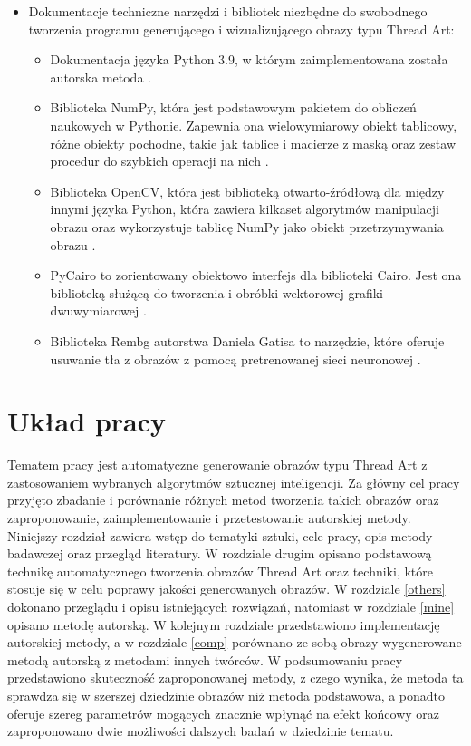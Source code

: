\documentclass[a4paper, 12pt, polish, twoside]{extreport}
\begin{document}
\begin{itemize}
\begin{itemize}
        \end{itemize}
        \item Dokumentacje techniczne narzędzi i bibliotek niezbędne do swobodnego tworzenia programu generującego i wizualizującego obrazy typu Thread Art:
        \begin{itemize}
            \item Dokumentacja języka Python 3.9, w którym zaimplementowana została autorska metoda \cite{python39}.
            \item Biblioteka NumPy, która jest podstawowym pakietem do obliczeń naukowych w Pythonie. Zapewnia ona wielowymiarowy obiekt tablicowy, różne obiekty pochodne, takie jak tablice i macierze z maską oraz zestaw procedur do szybkich operacji na nich \cite{numpy}.
            \item Biblioteka OpenCV, która jest biblioteką otwarto-źródłową dla między innymi języka Python, która zawiera kilkaset algorytmów manipulacji obrazu oraz wykorzystuje tablicę NumPy jako obiekt przetrzymywania obrazu \cite{opencv}.
            \item PyCairo to zorientowany obiektowo interfejs dla biblioteki Cairo. Jest ona biblioteką służącą do tworzenia i obróbki wektorowej grafiki dwuwymiarowej \cite{pycairo}.
            \item Biblioteka Rembg autorstwa Daniela Gatisa to narzędzie, które oferuje usuwanie tła z obrazów z pomocą pretrenowanej sieci neuronowej \cite{rembg}.
        \end{itemize}
    \end{itemize}
    
    \section{Układ pracy} \label{intro-layout}
    Tematem pracy jest automatyczne generowanie obrazów typu Thread Art z zastosowaniem wybranych algorytmów sztucznej inteligencji. Za główny cel pracy przyjęto zbadanie i porównanie różnych metod tworzenia takich obrazów oraz zaproponowanie, zaimplementowanie i przetestowanie autorskiej metody. Niniejszy rozdział zawiera wstęp do tematyki sztuki, cele pracy, opis metody badawczej oraz przegląd literatury. W rozdziale drugim opisano podstawową technikę automatycznego tworzenia obrazów Thread Art oraz techniki, które stosuje się w celu poprawy jakości generowanych obrazów. W rozdziale \ref{others} dokonano przeglądu i opisu istniejących rozwiązań, natomiast w rozdziale \ref{mine} opisano metodę autorską. W kolejnym rozdziale przedstawiono implementację autorskiej metody, a w rozdziale \ref{comp} porównano ze sobą obrazy wygenerowane metodą autorską z metodami innych twórców. W podsumowaniu pracy przedstawiono skuteczność zaproponowanej metody, z czego wynika, że metoda ta sprawdza się w szerszej dziedzinie obrazów niż metoda podstawowa, a ponadto oferuje szereg parametrów mogących znacznie wpłynąć na efekt końcowy oraz zaproponowano dwie możliwości dalszych badań w dziedzinie tematu. 
\end{document}
